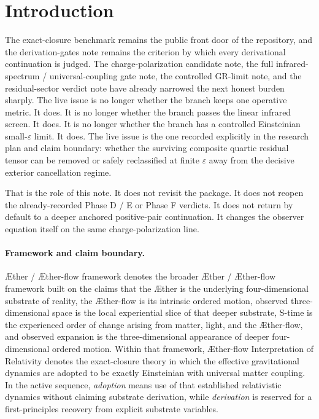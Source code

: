 \documentclass[11pt]{article}
\newcommand{\Aether}{\AE{}ther}
\newcommand{\Aflow}{\AE{}ther-flow}
\newcommand{\TheoryName}{\Aflow{} Interpretation of Relativity}
\newcommand{\TheoryProgram}{\Aether{} / \Aflow{} framework}
\newcommand{\epsIR}{\varepsilon}
\begin{document}
\section{Introduction}

The exact-closure benchmark remains the public front door of the repository, and the derivation-gates note remains the criterion by which every derivational continuation is judged. The charge-polarization candidate note, the full infrared-spectrum / universal-coupling gate note, the controlled GR-limit note, and the residual-sector verdict note have already narrowed the next honest burden sharply. The live issue is no longer whether the branch keeps one operative metric. It does. It is no longer whether the branch passes the linear infrared screen. It does. It is no longer whether the branch has a controlled Einsteinian small-\(\epsIR\) limit. It does. The live issue is the one recorded explicitly in the research plan and claim boundary: whether the surviving composite quartic residual tensor can be removed or safely reclassified at finite \(\epsIR\) away from the decisive exterior cancellation regime.

That is the role of this note. It does not revisit the package. It does not reopen the already-recorded Phase D / E or Phase F verdicts. It does not return by default to a deeper anchored positive-pair continuation. It changes the observer equation itself on the same charge-polarization line.

\paragraph{Framework and claim boundary.}
\TheoryProgram{} denotes the broader \Aether{} / \Aflow{} framework built on the claims that the \Aether{} is the underlying four-dimensional substrate of reality, the \Aflow{} is its intrinsic ordered motion, observed three-dimensional space is the local experiential slice of that deeper substrate, S-time is the experienced order of change arising from matter, light, and the \Aflow{}, and observed expansion is the three-dimensional appearance of deeper four-dimensional ordered motion. Within that framework, \TheoryName{} denotes the exact-closure theory in which the effective gravitational dynamics are adopted to be exactly Einsteinian with universal matter coupling. In the active sequence, \emph{adoption} means use of that established relativistic dynamics without claiming substrate derivation, while \emph{derivation} is reserved for a first-principles recovery from explicit substrate variables.
\end{document}
